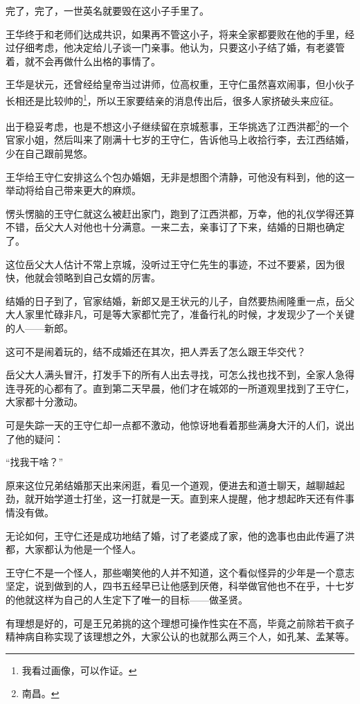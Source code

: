 \begin{multicols}{\theparacolNo}
完了，完了，一世英名就要毁在这小子手里了。

王华终于和老师们达成共识，如果再不管这小子，将来全家都要败在他的手里，经过仔细考虑，他决定给儿子谈一门亲事。他认为，只要这小子结了婚，有老婆管着，就不会再做什么出格的事情了。

王华是状元，还曾经给皇帝当过讲师，位高权重，王守仁虽然喜欢闹事，但小伙子长相还是比较帅的\footnote{我看过画像，可以作证。}，所以王家要结亲的消息传出后，很多人家挤破头来应征。

出于稳妥考虑，也是不想这小子继续留在京城惹事，王华挑选了江西洪都\footnote{南昌。}的一个官家小姐，然后叫来了刚满十七岁的王守仁，告诉他马上收拾行李，去江西结婚，少在自己跟前晃悠。

王华给王守仁安排这么个包办婚姻，无非是想图个清静，可他没有料到，他的这一举动将给自己带来更大的麻烦。

愣头愣脑的王守仁就这么被赶出家门，跑到了江西洪都，万幸，他的礼仪学得还算不错，岳父大人对他也十分满意。一来二去，亲事订了下来，结婚的日期也确定了。

这位岳父大人估计不常上京城，没听过王守仁先生的事迹，不过不要紧，因为很快，他就会领略到自己女婿的厉害。

结婚的日子到了，官家结婚，新郎又是王状元的儿子，自然要热闹隆重一点，岳父大人家里忙碌非凡，可是等大家都忙完了，准备行礼的时候，才发现少了一个关键的人——新郎。

这可不是闹着玩的，结不成婚还在其次，把人弄丢了怎么跟王华交代？

岳父大人满头冒汗，打发手下的所有人出去寻找，可怎么找也找不到，全家人急得连寻死的心都有了。直到第二天早晨，他们才在城郊的一所道观里找到了王守仁，大家都十分激动。

可是失踪一天的王守仁却一点都不激动，他惊讶地看着那些满身大汗的人们，说出了他的疑问：

“找我干啥？”

原来这位兄弟结婚那天出来闲逛，看见一个道观，便进去和道士聊天，越聊越起劲，就开始学道士打坐，这一打就是一天。直到来人提醒，他才想起昨天还有件事情没有做。

无论如何，王守仁还是成功地结了婚，讨了老婆成了家，他的逸事也由此传遍了洪都，大家都认为他是一个怪人。

王守仁不是一个怪人，那些嘲笑他的人并不知道，这个看似怪异的少年是一个意志坚定，说到做到的人，四书五经早已让他感到厌倦，科举做官他也不在乎，十七岁的他就这样为自己的人生定下了唯一的目标——做圣贤。

有理想是好的，可是王兄弟挑的这个理想可操作性实在不高，毕竟之前除若干疯子精神病自称实现了该理想之外，大家公认的也就那么两三个人，如孔某、孟某等。


\end{multicols}
